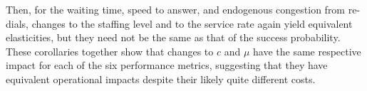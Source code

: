 \documentclass[manuscript,screen,authorversion]{acmart}
\begin{document}



Then, for the waiting time, speed to answer, and endogenous congestion from re-dials, changes to the staffing level and to the service rate again yield equivalent elasticities, but they need not be the same as that of the success probability.
These corollaries together show that changes to $c$ and $\mu$ have the same respective impact for each of the six performance metrics, suggesting that they have equivalent operational impacts despite their likely quite different costs. 

\end{document}
